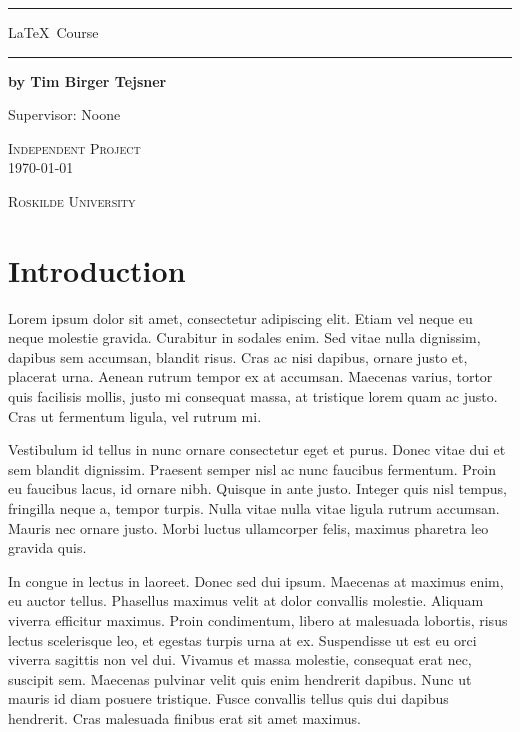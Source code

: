 \documentclass[a4paper,openright,twoside]{memoir}
\begin{document}
\begin{titlingpage}
\centering
\vspace*{1cm}
\hrule
\vspace*{1cm}
{\huge \textsf{\LaTeX \, Course}}

\vspace*{8mm}
\hrule
\vspace*{1cm}
\textbf{by Tim Birger Tejsner}

\vfill

\small Supervisor: Noone

\vspace*{1cm}

\textsc{Independent Project\\ \today}

\textsc{\textsc{Roskilde University}}
\end{titlingpage}

\tableofcontents*

\chapter{Introduction}
Lorem ipsum dolor sit amet, consectetur adipiscing elit. Etiam vel neque eu neque molestie gravida. Curabitur in sodales enim. Sed vitae nulla dignissim, dapibus sem accumsan, blandit risus. Cras ac nisi dapibus, ornare justo et, placerat urna. Aenean rutrum tempor ex at accumsan. Maecenas varius, tortor quis facilisis mollis, justo mi consequat massa, at tristique lorem quam ac justo. Cras ut fermentum ligula, vel rutrum mi.

Vestibulum id tellus in nunc ornare consectetur eget et purus. Donec vitae dui et sem blandit dignissim. Praesent semper nisl ac nunc faucibus fermentum. Proin eu faucibus lacus, id ornare nibh. Quisque in ante justo. Integer quis nisl tempus, fringilla neque a, tempor turpis. Nulla vitae nulla vitae ligula rutrum accumsan. Mauris nec ornare justo. Morbi luctus ullamcorper felis, maximus pharetra leo gravida quis.

In congue in lectus in laoreet. Donec sed dui ipsum. Maecenas at maximus enim, eu auctor tellus. Phasellus maximus velit at dolor convallis molestie. Aliquam viverra efficitur maximus. Proin condimentum, libero at malesuada lobortis, risus lectus scelerisque leo, et egestas turpis urna at ex. Suspendisse ut est eu orci viverra sagittis non vel dui. Vivamus et massa molestie, consequat erat nec, suscipit sem. Maecenas pulvinar velit quis enim hendrerit dapibus. Nunc ut mauris id diam posuere tristique. Fusce convallis tellus quis dui dapibus hendrerit. Cras malesuada finibus erat sit amet maximus.
\end{document}
